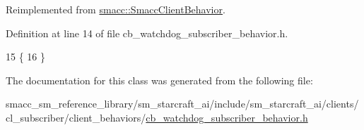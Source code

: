 Reimplemented from \hyperlink{classsmacc_1_1SmaccClientBehavior_a7962382f93987c720ad432fef55b123f}{smacc\+::\+Smacc\+Client\+Behavior}.



Definition at line 14 of file cb\+\_\+watchdog\+\_\+subscriber\+\_\+behavior.\+h.


\begin{DoxyCode}
15     \{
16     \}
\end{DoxyCode}


The documentation for this class was generated from the following file\+:\begin{DoxyCompactItemize}
\item 
smacc\+\_\+sm\+\_\+reference\+\_\+library/sm\+\_\+starcraft\+\_\+ai/include/sm\+\_\+starcraft\+\_\+ai/clients/cl\+\_\+subscriber/client\+\_\+behaviors/\hyperlink{sm__starcraft__ai_2include_2sm__starcraft__ai_2clients_2cl__subscriber_2client__behaviors_2cb__wdfb3e50077225b2325e3a32b4e37e7e5}{cb\+\_\+watchdog\+\_\+subscriber\+\_\+behavior.\+h}\end{DoxyCompactItemize}

